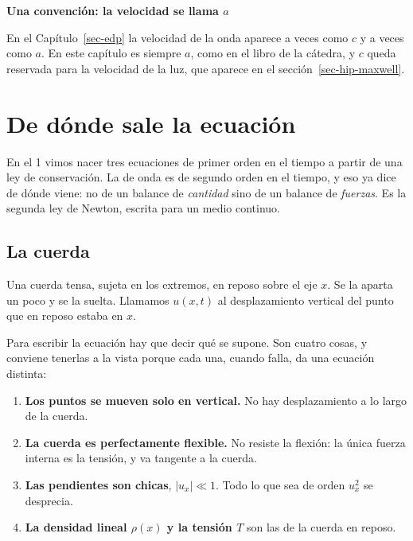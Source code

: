 \documentclass[
  spanish,
  a4paper,
]{scrbook}
\providecommand{\tightlist}{%
  \setlength{\itemsep}{0pt}\setlength{\parskip}{0pt}}
\theoremstyle{definition}
\theoremstyle{plain}
\theoremstyle{definition}
\theoremstyle{plain}
\theoremstyle{definition}
\theoremstyle{remark}
\begin{document}
\begin{tcolorbox}[enhanced jigsaw, arc=.35mm, bottomrule=.15mm, breakable, colback=white, colframe=quarto-callout-warning-color-frame, left=2mm, leftrule=.75mm, opacityback=0, rightrule=.15mm, toprule=.15mm]
\begin{minipage}[t]{5.5mm}
\textcolor{quarto-callout-warning-color}{\faExclamationTriangle}
\end{minipage}%
\begin{minipage}[t]{\textwidth - 5.5mm}

\vspace{-3mm}\textbf{Una convención: la velocidad se llama \(a\)}\vspace{3mm}

En el Capítulo~\ref{sec-edp} la velocidad de la onda aparece a veces
como \(c\) y a veces como \(a\). En este capítulo es siempre \(a\), como
en el libro de la cátedra, y \(c\) queda reservada para la velocidad de
la luz, que aparece en el sección~\ref{sec-hip-maxwell}.

\end{minipage}%
\end{tcolorbox}

\section{De dónde sale la ecuación}\label{sec-hip-deduccion}

En el 1 vimos nacer tres ecuaciones de primer orden en el tiempo a
partir de una ley de conservación. La de onda es de segundo orden en el
tiempo, y eso ya dice de dónde viene: no de un balance de
\emph{cantidad} sino de un balance de \emph{fuerzas}. Es la segunda ley
de Newton, escrita para un medio continuo.

\subsection{La cuerda}\label{sec-hip-cuerda}

Una cuerda tensa, sujeta en los extremos, en reposo sobre el eje \(x\).
Se la aparta un poco y se la suelta. Llamamos \(u(x,t)\) al
desplazamiento vertical del punto que en reposo estaba en \(x\).

Para escribir la ecuación hay que decir qué se supone. Son cuatro cosas,
y conviene tenerlas a la vista porque cada una, cuando falla, da una
ecuación distinta:

\begin{enumerate}
\def\labelenumi{\arabic{enumi}.}
\tightlist
\item
  \textbf{Los puntos se mueven solo en vertical.} No hay desplazamiento
  a lo largo de la cuerda.
\item
  \textbf{La cuerda es perfectamente flexible.} No resiste la flexión:
  la única fuerza interna es la tensión, y va tangente a la cuerda.
\item
  \textbf{Las pendientes son chicas}, \(|u_x| \ll 1\). Todo lo que sea
  de orden \(u_x^2\) se desprecia.
\item
  \textbf{La densidad lineal \(\rho(x)\) y la tensión \(T\)} son las de
  la cuerda en reposo.
\end{enumerate}
\end{document}
